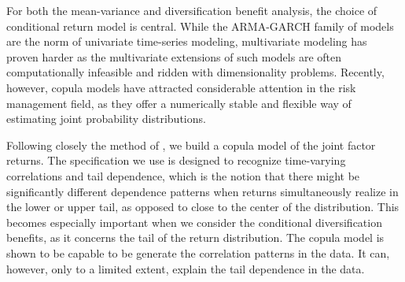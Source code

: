 For both the mean-variance and diversification benefit analysis, the choice of conditional return model is central. While the ARMA-GARCH family of models are the norm of univariate time-series modeling, multivariate modeling has proven harder as the multivariate extensions of such models are often computationally infeasible and ridden with dimensionality problems. Recently, however, copula models have attracted considerable attention in the risk management field, as they offer a numerically stable and flexible way of estimating joint probability distributions. 

Following closely the method of \textcite{ChristoffersenLanglois2013}, we build a copula model of the joint factor returns. The specification we use is designed to recognize time-varying correlations and tail dependence, which is the notion that there might be significantly different dependence patterns when returns simultaneously realize in the lower or upper tail, as opposed to close to the center of the distribution. This becomes especially important when we consider the conditional diversification benefits, as it concerns the tail of the return distribution. The copula model is shown to be capable to be generate the correlation patterns in the data. It can, however, only to a limited extent, explain the tail dependence in the data.

 
